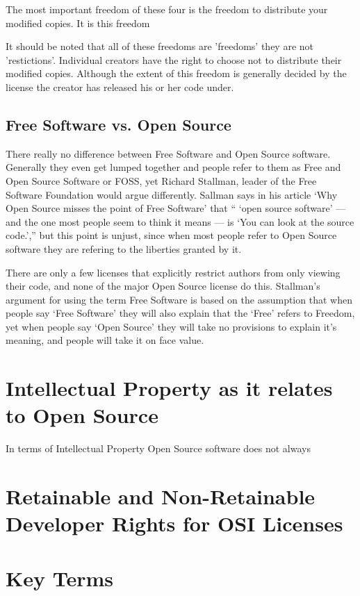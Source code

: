 \documentclass[12pt,letterpaper]{article}
\begin{document}
The most important freedom of these four is the freedom to distribute
your modified copies. It is this freedom

It should be noted that all of these freedoms are 'freedoms' they are
not 'restictions'. Individual creators have the right to choose not to
distribute their modified copies. Although the extent of this freedom is
generally decided by the license the creator has released his or her
code under.

\subsection*{Free Software vs. Open Source}
There really no difference between Free Software and Open Source software.
Generally they even get lumped together and people refer to them as Free and
Open Source Software or FOSS, yet Richard Stallman, leader of the Free Software
Foundation would argue differently. Sallman says in his article `Why Open
Source misses the point of Free Software' that `` `open source software' — and the
one most people seem to think it means — is `You can look at the source
code.','' but this point is unjust, since when most people refer to Open Source
software they are refering to the liberties granted by it. 

There are only a few licenses that explicitly restrict authors from only
viewing their code, and none of the major Open Source license do this.
Stallman's argument for using the term Free Software is based on the assumption
that when people say `Free Software' they will also explain that the `Free'
refers to Freedom, yet when people say `Open Source' they will take no
provisions to explain it's meaning, and people will take it on face value.  

\section*{Intellectual Property as it relates to Open Source}
In terms of Intellectual Property Open Source software does not always


\section*{Retainable and Non-Retainable Developer Rights for OSI Licenses}


\section*{Key Terms}
\end{document}
